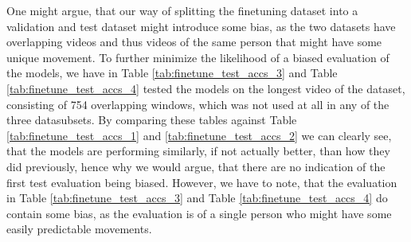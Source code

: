 \documentclass[./main.tex]{subfiles}
\begin{document}
\noindent One might argue, that our way of splitting the finetuning dataset into a validation and test dataset might introduce some bias, as the two datasets have overlapping videos and thus videos of the same person that might have some unique movement. To further minimize the likelihood of a biased evaluation of the models, we have in Table \ref{tab:finetune_test_accs_3} and Table \ref{tab:finetune_test_accs_4} tested the models on the longest video of the dataset, consisting of 754 overlapping windows, which was not used at all in any of the three datasubsets. By comparing these tables against Table \ref{tab:finetune_test_accs_1} and \ref{tab:finetune_test_accs_2} we can clearly see, that the models are performing similarly, if not actually better, than how they did previously, hence why we would argue, that there are no indication of the first test evaluation being biased. However, we have to note, that the evaluation in Table \ref{tab:finetune_test_accs_3} and Table \ref{tab:finetune_test_accs_4} do contain some bias, as the evaluation is of a single person who might have some easily predictable movements.
\\
\\
\end{document}
